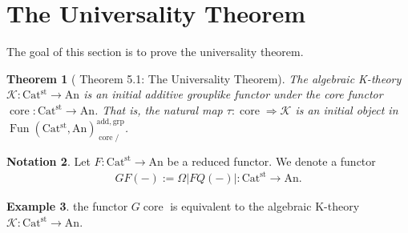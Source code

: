 \documentclass[a4paper,dvipdfmx,11pt,reqno]{amsart}
\DeclareMathOperator{\Fun}{Fun}
\newcommand{\K}{\mathcal{K}}
\DeclareMathOperator{\core}{core}
\newcommand{\An}{\mathrm{An}}
\newcommand{\Catst}{\mathrm{Cat^{st}}}
\newtheorem{theorem}{Theorem}[section]
\theoremstyle{definition}
\newtheorem{example}[theorem]{Example}
\newtheorem{notation}[theorem]{Notation}
\begin{document}
\section{The Universality Theorem}

The goal of this section is to prove the universality theorem.

\begin{theorem}[\cite{HLS23} Theorem 5.1: The Universality Theorem] \label{thrm.universality_theorem}
  The algebraic K-theory $\K : \Catst \to \An$ is an initial additive grouplike functor under the core functor $\core : \Catst \to \An$.
  That is, the natural map $\tau : \core \Rightarrow \K$ is an initial object in $\Fun(\Catst,\An)^{\mathrm{add,grp}}_{\core/}$.
\end{theorem}

\begin{notation}
  Let $F : \Catst \to \An$ be a reduced functor.
  We denote a functor 
  \begin{align*}
    GF(-) := \Omega|FQ(-)| : \Catst \to \An. 
  \end{align*}
\end{notation}

\begin{example}
  the functor $G\core$ is equivalent to the algebraic K-theory $\K : \Catst \to \An$.
\end{example}
\end{document}
